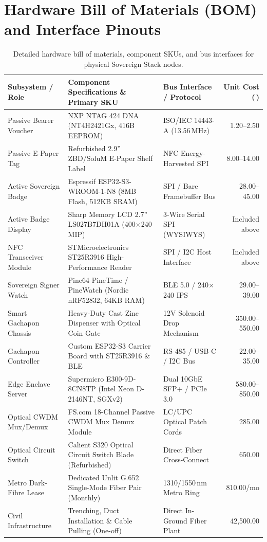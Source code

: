 \documentclass[a4paper,11pt,twoside,parskip=half-,headings=small]{scrartcl}
\newcommand{\EUR}[1]{\texteuro\,#1}
\begin{document}
\section{Hardware Bill of Materials (BOM) and Interface Pinouts}
\label{app:bom}
\label{sec:bom}

\begin{table}[H]
\centering\scriptsize
\renewcommand{\arraystretch}{1.2}
\begin{tabularx}{\linewidth}{@{}L{3.0cm} L{4.6cm} L{3.2cm} r@{}}
\toprule
\textbf{Subsystem / Role} & \textbf{Component Specifications \& Primary SKU} & \textbf{Bus Interface / Protocol} & \textbf{Unit Cost (\EUR{})}\\
\midrule
Passive Bearer Voucher & NXP NTAG 424 DNA (NT4H2421Gx, 416B EEPROM) & ISO/IEC 14443-A (13.56\,MHz) & 1.20--2.50\\
Passive E-Paper Tag & Refurbished 2.9'' ZBD/SoluM E-Paper Shelf Label & NFC Energy-Harvested SPI & 8.00--14.00\\
Active Sovereign Badge & Espressif ESP32-S3-WROOM-1-N8 (8MB Flash, 512KB SRAM) & SPI / Bare Framebuffer Bus & 28.00--45.00\\
Active Badge Display & Sharp Memory LCD 2.7'' LS027B7DH01A (400$\times$240 MIP) & 3-Wire Serial SPI (WYSIWYS) & Included above\\
NFC Transceiver Module & STMicroelectronics ST25R3916 High-Performance Reader & SPI / I2C Host Interface & Included above\\
Sovereign Signer Watch & Pine64 PineTime / PineWatch (Nordic nRF52832, 64KB RAM) & BLE 5.0 / 240$\times$240 IPS & 29.00--39.00\\
Smart Gachapon Chassis & Heavy-Duty Cast Zinc Dispenser with Optical Coin Gate & 12V Solenoid Drop Mechanism & 350.00--550.00\\
Gachapon Controller & Custom ESP32-S3 Carrier Board with ST25R3916 \& BLE & RS-485 / USB-C / I2C Bus & 22.00--35.00\\
Edge Enclave Server & Supermicro E300-9D-8CN8TP (Intel Xeon D-2146NT, SGXv2) & Dual 10GbE SFP+ / PCIe 3.0 & 580.00--850.00\\
Optical CWDM Mux/Demux & FS.com 18-Channel Passive CWDM Mux Demux Module & LC/UPC Optical Patch Cords & 285.00\\
Optical Circuit Switch & Calient S320 Optical Circuit Switch Blade (Refurbished) & Direct Fiber Cross-Connect & 650.00\\
Metro Dark-Fibre Lease & Dedicated Unlit G.652 Single-Mode Fiber Pair (Monthly) & 1310/1550\,nm Metro Ring & 810.00/mo\\
Civil Infrastructure & Trenching, Duct Installation \& Cable Pulling (One-off) & Direct In-Ground Fiber Plant & 42,500.00\\
\bottomrule
\end{tabularx}
\caption{Detailed hardware bill of materials, component SKUs, and bus interfaces for physical Sovereign Stack nodes.}
\end{table}
\end{document}
